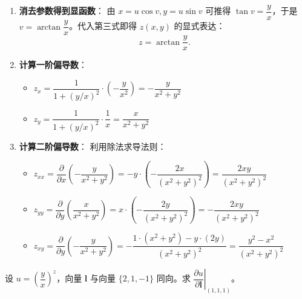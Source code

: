 \documentclass[lang=cn,11pt]{elegantbook}
\begin{document}
\begin{solution}
\begin{enumerate}
  \item \textbf{消去参数得到显函数}：
  由 $x=u\cos v, y=u\sin v$ 可推得 $\tan v = \dfrac{y}{x}$，于是 $v = \arctan\dfrac{y}{x}$。代入第三式即得 $z(x,y)$ 的显式表达：
  \[
  z = \arctan\frac{y}{x}.
  \]
  
  \item \textbf{计算一阶偏导数}：
  \begin{itemize}
    \item $z_x = \dfrac{1}{1+(y/x)^2} \cdot \left(-\dfrac{y}{x^2}\right) = -\dfrac{y}{x^2+y^2}$
    \item $z_y = \dfrac{1}{1+(y/x)^2} \cdot \dfrac{1}{x} = \dfrac{x}{x^2+y^2}$
  \end{itemize}
  
  \item \textbf{计算二阶偏导数}：
  利用除法求导法则：
  \begin{itemize}
    \item $z_{xx} = \dfrac{\partial}{\partial x}\left( -\dfrac{y}{x^2+y^2} \right) = -y \cdot \left(-\dfrac{2x}{(x^2+y^2)^2}\right) = \dfrac{2xy}{(x^2+y^2)^2}$
    \item $z_{yy} = \dfrac{\partial}{\partial y}\left( \dfrac{x}{x^2+y^2} \right) = x \cdot \left(-\dfrac{2y}{(x^2+y^2)^2}\right) = -\dfrac{2xy}{(x^2+y^2)^2}$
    \item $z_{xy} = \dfrac{\partial}{\partial y}\left( -\dfrac{y}{x^2+y^2} \right) = -\dfrac{1\cdot(x^2+y^2) - y\cdot(2y)}{(x^2+y^2)^2} = \dfrac{y^2-x^2}{(x^2+y^2)^2}$
  \end{itemize}
\end{enumerate}
\end{solution}



\begin{exercise}[方向导数的基本计算]
设 $u=\left(\dfrac{y}{x}\right)^{\!z}$，向量 $\boldsymbol l$ 与向量 $\{2,1,-1\}$ 同向。求 $\left.\dfrac{\partial u}{\partial \boldsymbol l}\right|_{(1,1,1)}$。
\end{exercise}
\end{document}
